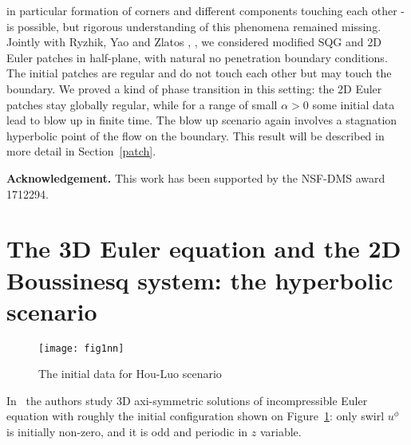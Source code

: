 \documentclass[reqno,centertags, 11pt]{amsart}
\begin{document}
in particular formation of corners and different components touching each other - is possible, but rigorous understanding of this phenomena remained missing.
Jointly with Ryzhik, Yao and Zlatos \cite{KRYZ}, \cite{KYZ}, we considered modified SQG and 2D Euler patches in half-plane, with natural no penetration boundary conditions. The initial
patches are regular and do not touch each other but may touch the boundary. We proved a kind of phase transition in this setting: the 2D Euler patches stay globally regular, while for a
range of small $\alpha>0$ some initial data lead to blow up in finite time.
The blow up scenario again involves a stagnation hyperbolic point of the flow on the boundary.
This result will be described in more detail in Section~\ref{patch}.


{\bf Acknowledgement.} This work has been supported by the NSF-DMS award 1712294.


\section{The 3D Euler equation and the 2D Boussinesq system: the hyperbolic scenario}\label{hyp}


\begin{figure}
\begin{center}\label{fig11}
\texttt{[image: fig1nn]}
\caption{The initial data for Hou-Luo scenario}
\end{center}
\end{figure}

In~\cite{HouLuo} the authors study 3D axi-symmetric solutions of incompressible Euler equation with roughly the initial configuration shown on Figure~\ref{fig11}:
only swirl $u^\phi$ is initially non-zero, and it is odd and periodic in $z$ variable.
\end{document}
